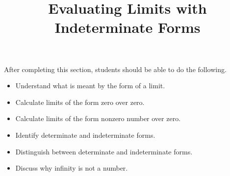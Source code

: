 \documentclass{ximera}
\title{Evaluating Limits with Indeterminate Forms}
\begin{document}
\begin{abstract}
\end{abstract}
\maketitle

\begin{sectionOutcomes}
After completing this section, students should be able to do the following.

\begin{itemize}
\item Understand what is meant by the form of a limit.
\item Calculate limits of the form zero over zero.
\item Calculate limits of the form nonzero number over zero.
\item Identify determinate and indeterminate forms.
\item Distinguish between determinate and indeterminate forms.
\item Discuss why infinity is not a number.
\end{itemize}
\end{sectionOutcomes}
\end{document}
